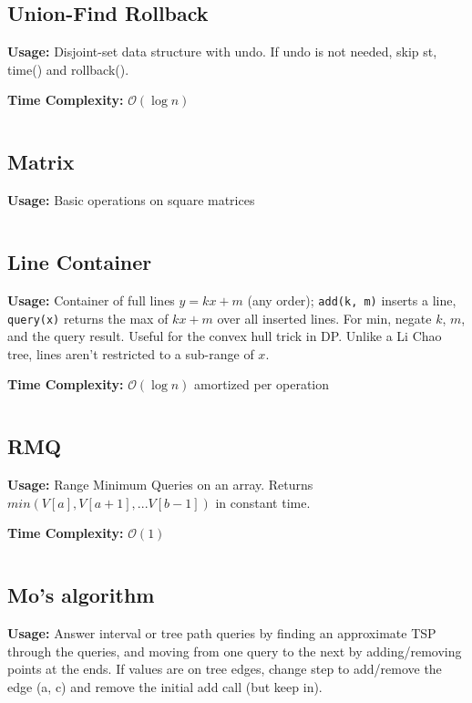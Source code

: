   \subsection{Union-Find Rollback}
    \par \textbf{Usage:} Disjoint-set data structure with undo.
    If undo is not needed, skip st, time() and rollback().
    \par \textbf{Time Complexity:} $\mathcal{O}(\log n)$
    \inputminted{cpp}{library/structures/dsu.hpp}

  \subsection{Matrix}
    \par \textbf{Usage:} Basic operations on square matrices
    \inputminted{cpp}{library/structures/matrix.cpp}

  \subsection{Line Container}
    \par \textbf{Usage:} Container of full lines $y=kx+m$ (any order); \texttt{add(k, m)} inserts a line, \texttt{query(x)} returns the max of $kx+m$ over all inserted lines. For min, negate $k$, $m$, and the query result. Useful for the convex hull trick in DP. Unlike a Li Chao tree, lines aren't restricted to a sub-range of $x$.
    \par \textbf{Time Complexity:} $\mathcal{O}(\log n)$ amortized per operation
    \inputminted{cpp}{library/structures/line_container.cpp}

  \subsection{RMQ}
    \par \textbf{Usage:} Range Minimum Queries on an array. Returns $min(V[a], V[a + 1], ... V[b - 1])$ in constant time.
    \par \textbf{Time Complexity:} $\mathcal{O}(1)$
    \inputminted{cpp}{library/structures/sparse_table.hpp}
  \subsection{Mo's algorithm}
    \par \textbf{Usage:} Answer interval or tree path queries by finding an approximate TSP through the queries, and moving from one query to the next by adding/removing points at the ends.
    If values are on tree edges, change
step to add/remove the edge (a, c) and remove the initial add call (but
keep in).
    \inputminted{cpp}{library/structures/mo.cpp}
